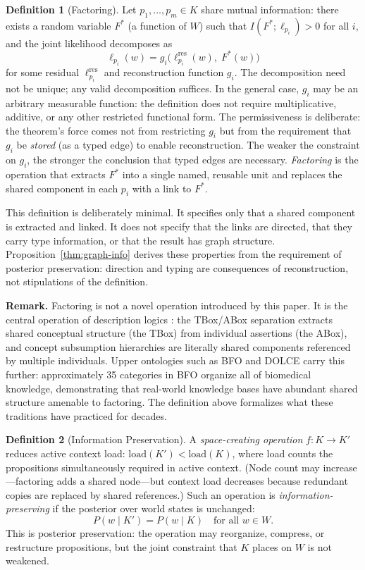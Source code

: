 \documentclass[11pt]{article}
\theoremstyle{definition}
\newtheorem{definition}{Definition}
\begin{document}
\begin{definition}[Factoring]
\label{def:factoring}
Let $p_1, \ldots, p_m \in K$ share mutual information: there exists a
random variable $F^*$ (a function of $W$) such that
$I(F^*; \ell_{p_i}) > 0$ for all $i$, and the joint likelihood
decomposes as
\[
\ell_{p_i}(w) = g_i\!\bigl(\ell_{p_i}^{\text{res}}(w),\; F^*(w)\bigr)
\]
for some residual $\ell_{p_i}^{\text{res}}$ and reconstruction function
$g_i$. The decomposition need not be unique; any valid decomposition
suffices. In the general case, $g_i$ may be an arbitrary measurable
function: the definition does not require multiplicative,
additive, or any other restricted functional form. The permissiveness
is deliberate: the theorem's force comes not from restricting $g_i$
but from the requirement that $g_i$ be \emph{stored} (as a typed edge)
to enable reconstruction. The weaker the constraint on $g_i$, the
stronger the conclusion that typed edges are necessary.
\emph{Factoring} is the operation that extracts $F^*$ into a single
named, reusable unit and replaces the shared component in each $p_i$
with a link to $F^*$.

This definition is deliberately minimal. It specifies only that a
shared component is extracted and linked. It does not specify that
the links are directed, that they carry type information, or that
the result has graph structure. Proposition~\ref{thm:graph-info}
derives these properties from the requirement of posterior
preservation: direction and typing are consequences of
reconstruction, not stipulations of the definition.

\textbf{Remark.} Factoring is not a novel operation introduced by this
paper. It is the central operation of description logics
\cite{BaaderCalvaneseEtAl2003}: the TBox/ABox separation extracts shared
conceptual structure (the TBox) from individual assertions (the ABox),
and concept subsumption hierarchies are literally shared components
referenced by multiple individuals. Upper ontologies such as BFO
\cite{Arp2015} and DOLCE \cite{Masolo2003} carry this further:
approximately 35 categories in BFO organize all of biomedical knowledge,
demonstrating that real-world knowledge bases have abundant shared
structure amenable to factoring. The definition above formalizes what
these traditions have practiced for decades.
\end{definition}

\begin{definition}[Information Preservation]
\label{def:preservation}
A \emph{space-creating operation} $f : K \to K'$ reduces active context
load: $\mathrm{load}(K') < \mathrm{load}(K)$, where load counts the
propositions simultaneously required in active context. (Node count may
increase---factoring adds a shared node---but context load decreases
because redundant copies are replaced by shared references.) Such an
operation is \emph{information-preserving} if the posterior over world
states is unchanged:
\[
P(w \mid K') = P(w \mid K) \quad \text{for all } w \in W.
\]
This is posterior preservation: the operation may reorganize, compress,
or restructure propositions, but the joint constraint that $K$ places
on $W$ is not weakened.
\end{definition}
\end{document}
